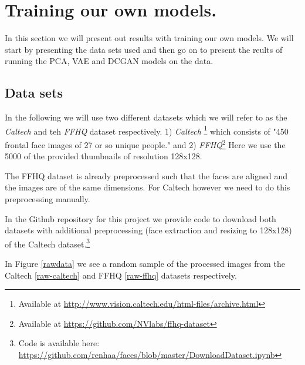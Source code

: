 \newpage
\section{Training our own models.} \label{training}

In this section we will present out results with training our own models. We will start by presenting the data sets used and then go on to present the reults of running the  PCA, VAE and DCGAN models on the data.

\subsection{Data sets}
In the following we will use two different datasets which we will refer to as the \emph{Caltech} and teh  \emph{FFHQ} dataset respectively. 1)  \emph{Caltech} \footnote{Available at \url{http://www.vision.caltech.edu/html-files/archive.html}} which consists of "450 frontal face images of 27 or so unique people." and 2) \emph{FFHQ}\footnote{Available at \url{https://github.com/NVlabs/ffhq-dataset}} Here we use the 5000 of the provided thumbnails of resolution 128x128.

The FFHQ dataset is already preprocessed such that the faces are aligned and the images are of the same dimensions. For Caltech however we need to do this preprocessing manually.

In the Github repository for this project we provide code to download both datasets with additional preprocessing  (face extraction and resizing to 128x128) of the Caltech dataset.\footnote{Code is available here: \url{https://github.com/renhaa/faces/blob/master/DownloadDataset.ipynb}}

In Figure \ref{rawdata} we see a random sample of the processed images from the Caltech \ref{raw-caltech} and FFHQ \ref{raw-ffhq} datasets respectively.

